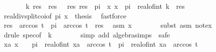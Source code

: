 \begin{isabellebody}
\ \ \ \ \isamarkupfalse%
\ \isamarkupfalse%
\ k\ res\ \ res{\isacharcolon}{\kern0pt}\ {\isachardoublequoteopen}{}\ {\isasymle}\ res{\isachardoublequoteclose}\ {\isachardoublequoteopen}res\ {\isacharless}{\kern0pt}\ {}{\isacharasterisk}{\kern0pt}pi{\isachardoublequoteclose}\ \ x{\isacharcolon}{\kern0pt}\ {\isachardoublequoteopen}x\ {\isacharequal}{\kern0pt}\ pi{\isacharasterisk}{\kern0pt}\ {}{\isacharasterisk}{\kern0pt}\ real{\isacharunderscore}{\kern0pt}of{\isacharunderscore}{\kern0pt}int\ k\ {\isacharplus}{\kern0pt}\ res{\isachardoublequoteclose}\isanewline
\ \ \ \ \ \ \isamarkupfalse%
\ real{\isacharunderscore}{\kern0pt}div{\isacharunderscore}{\kern0pt}split{\isacharunderscore}{\kern0pt}coi{\isacharbrackleft}{\kern0pt}of\ {\isachardoublequoteopen}{}{\isacharasterisk}{\kern0pt}pi{\isachardoublequoteclose}\ x\ {}\ thesis{\isacharbrackright}{\kern0pt}\ \isamarkupfalse%
\ fastforce\isanewline
\ \ \ \ \isamarkupfalse%
\ {\isachardoublequoteopen}res\ {\isasymle}\ arccos\ t\ {\isacharbar}{\kern0pt}\ {}{\isacharasterisk}{\kern0pt}pi\ {\isacharminus}{\kern0pt}\ arccos\ t\ {\isasymle}\ res{\isachardoublequoteclose}\ \isamarkupfalse%
\ asm\ x\isanewline
\ \ \ \ \ \ \isamarkupfalse%
\ {\isacharparenleft}{\kern0pt}subst\ {\isacharparenleft}{\kern0pt}asm{\isacharparenright}{\kern0pt}\ not{\isacharunderscore}{\kern0pt}ex{\isacharparenright}{\kern0pt}\isanewline
\ \ \ \ \ \ \isamarkupfalse%
\ {\isacharparenleft}{\kern0pt}drule\ spec{\isacharbrackleft}{\kern0pt}of\ {\isacharunderscore}{\kern0pt}\ {\isachardoublequoteopen}k{\isachardoublequoteclose}{\isacharbrackright}{\kern0pt}{\isacharparenright}{\kern0pt}\isanewline
\ \ \ \ \ \ \isamarkupfalse%
\ {\isacharparenleft}{\kern0pt}simp\ add{\isacharcolon}{\kern0pt}\ algebra{\isacharunderscore}{\kern0pt}simps\ {\isacharbar}{\kern0pt}\ safe{\isacharparenright}{\kern0pt}{\isacharplus}{\kern0pt}\isanewline
\ \ \ \ \isamarkupfalse%
\ \isamarkupfalse%
\ {\isachardoublequoteopen}{\isasymexists}xa{\isachardot}{\kern0pt}\ x\ {\isasymin}\ {\isacharbraceleft}{\kern0pt}{}\ {\isacharasterisk}{\kern0pt}\ pi\ {\isacharasterisk}{\kern0pt}\ real{\isacharunderscore}{\kern0pt}of{\isacharunderscore}{\kern0pt}int\ xa\ {\isacharminus}{\kern0pt}\ arccos\ t{\isachardot}{\kern0pt}{\isachardot}{\kern0pt}{}\ {\isacharasterisk}{\kern0pt}\ pi\ {\isacharasterisk}{\kern0pt}\ real{\isacharunderscore}{\kern0pt}of{\isacharunderscore}{\kern0pt}int\ xa\ {\isacharplus}{\kern0pt}\ arccos\ t{\isacharbraceright}{\kern0pt}{\isachardoublequoteclose}\isanewline

\end{isabellebody}
